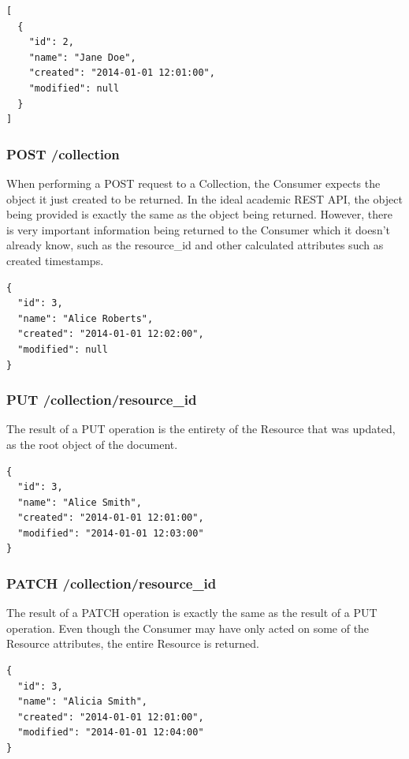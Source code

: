 \documentclass{book}
\begin{document}
\begin{verbatim}
[
  {
    "id": 2,
    "name": "Jane Doe",
    "created": "2014-01-01 12:01:00",
    "modified": null
  }
]
\end{verbatim}

\subsubsection{POST /collection}

When performing a POST request to a Collection, the Consumer expects the object it just created to be returned. In the ideal academic REST API, the object being provided is exactly the same as the object being returned. However, there is very important information being returned to the Consumer which it doesn't already know, such as the resource\_id and other calculated attributes such as created timestamps.

\begin{verbatim}
{
  "id": 3,
  "name": "Alice Roberts",
  "created": "2014-01-01 12:02:00",
  "modified": null
}
\end{verbatim}

\subsubsection{PUT /collection/resource\_id}

The result of a PUT operation is the entirety of the Resource that was updated, as the root object of the document.

\begin{verbatim}
{
  "id": 3,
  "name": "Alice Smith",
  "created": "2014-01-01 12:01:00",
  "modified": "2014-01-01 12:03:00"
}
\end{verbatim}

\subsubsection{PATCH /collection/resource\_id}

The result of a PATCH operation is exactly the same as the result of a PUT operation. Even though the Consumer may have only acted on some of the Resource attributes, the entire Resource is returned.

\begin{verbatim}
{
  "id": 3,
  "name": "Alicia Smith",
  "created": "2014-01-01 12:01:00",
  "modified": "2014-01-01 12:04:00"
}
\end{verbatim}
\end{document}

